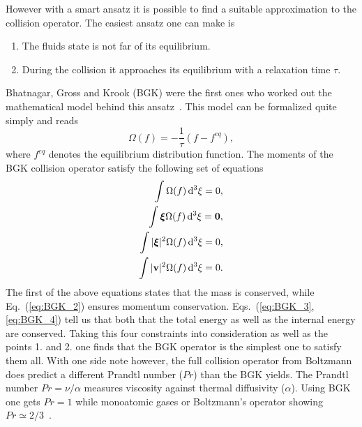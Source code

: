 However with a smart ansatz it is possible to find a suitable approximation to the collision operator.
The easiest ansatz one can make is
\begin{enumerate}
    \item The fluids state is not far of its equilibrium.
    \item During the collision it approaches its equilibrium with a relaxation time $\tau$.
\end{enumerate}
Bhatnagar, Gross and Krook (BGK) were the first ones who worked out the mathematical model behind this ansatz~\cite{PhysRev.94.511}.
This model can be formalized quite simply and reads
\begin{equation}
    \Omega(f) = -\frac{1}{\tau}(f - f^{eq}),
\end{equation}
where $f^{eq}$ denotes the equilibrium distribution function.
The moments of the BGK collision operator satisfy the following set of equations
\begin{align}
    \int \Omega(f) \mathop{}\!\mathrm{d}^3\xi = 0, \label{eq:BGK_1}\\
    \int {\boldsymbol\xi}\Omega(f) \mathop{}\!\mathrm{d}^3\xi = \mathbf{0}, \label{eq:BGK_2}\\
    \int |{\boldsymbol\xi}|^2\Omega(f) \mathop{}\!\mathrm{d}^3\xi = 0, \label{eq:BGK_3}\\
    \int |\mathbf{v}|^2\Omega(f) \mathop{}\!\mathrm{d}^3\xi = 0. \label{eq:BGK_4}
\end{align}
The first of the above equations states that the mass is conserved, while Eq.~(\ref{eq:BGK_2}) ensures momentum conservation.
Eqs.~(\ref{eq:BGK_3}, \ref{eq:BGK_4}) tell us that both that the total energy as well as the internal energy are conserved.
Taking this four constraints into consideration as well as the points 1. and 2. one finds that the BGK operator is the simplest one to satisfy them all.
With one side note however, the full collision operator from Boltzmann does predict a different Prandtl number ($Pr$) than the BGK yields.
The Prandtl number $Pr = \nu/\alpha$ measures viscosity against thermal diffusivity ($\alpha$). 
Using BGK one gets $Pr=1$ while monoatomic gases or Boltzmann's operator showing $Pr\simeq 2/3$~\cite{cercignani1988boltzmann, krugerLatticeBoltzmannMethod2017}.

